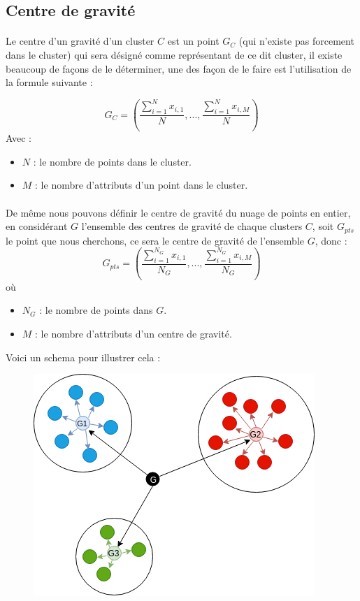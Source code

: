 	\subsection{Centre de gravité}
		\paragraph{}
		Le centre d'un gravité d'un cluster $C$ est un point $G_C$ (qui n'existe pas forcement dans le cluster) qui sera désigné comme représentant de ce dit cluster, il existe beaucoup de façons de le déterminer, une des façon de le faire est l'utilisation de la formule suivante : 
		
		\[
			G_C = (\frac{\sum_{i=1}^{N} x_{i,1}}{N} , ... , \frac{\sum_{i=1}^{N} x_{i,M}}{N})
		\]
		Avec : 
		\begin{itemize}
			\item $N$ : le nombre de points dans le cluster.
			\item $M$ : le nombre d'attributs d'un point dans le cluster.
		\end{itemize}
		
		\paragraph{}
		De même nous pouvons définir le centre de gravité du nuage de points en entier, en considérant $G$ l'ensemble des centres de gravité de chaque clusters $C$, soit $G_{pts}$ le point que nous cherchons, ce sera le centre de gravité de l'ensemble $G$, donc :
		\[
				G_{pts} = (\frac{\sum_{i=1}^{N_G} x_{i,1}}{N_G} , ... , \frac{\sum_{i=1}^{N_G} x_{i,M}}{N_G})
		\]
		où 
		\begin{itemize}
			\item $N_G$ : le nombre de points dans $G$.
			\item $M$ : le nombre d'attributs d'un centre de gravité.
		\end{itemize}
		\par 
		Voici un schema pour illustrer cela :
		\begin{figure}[H]
			\centering
			\includegraphics[width=0.60\linewidth]{dbscan/images/clusters.png}
			
		\end{figure}
	\newpage
